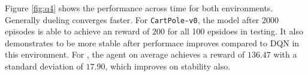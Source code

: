 \documentclass[12pt]{article}
\begin{document}
Figure \ref{fig:q4} shows the performance across time for both environments. Generally dueling converges faster. For \texttt{CartPole-v0}, the model after 2000 episodes is able to achieve an reward of $200$ for all 100 epsidoes in testing. It also demonstrates to be more stable after performace improves compared to DQN in this environment. For , the agent on average achieves a reward of $136.47$ with a standard deviation of $17.90$, which improves on stability also.
\end{document}

